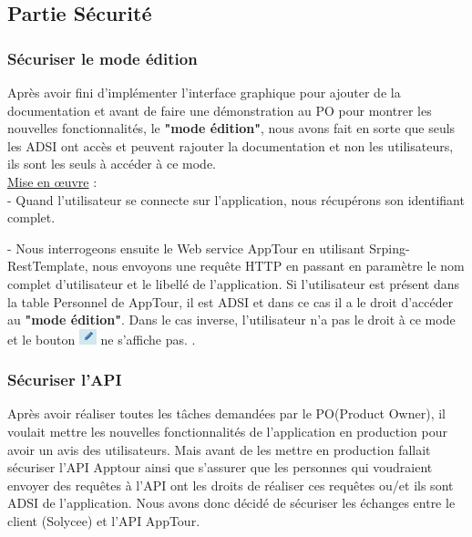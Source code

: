 \documentclass[12pt]{article}
\begin{document}
\subsection{Partie Sécurité}

\subsubsection{Sécuriser le mode édition}
	
	Après avoir fini d'implémenter l'interface graphique pour ajouter de la documentation et avant de faire une démonstration au PO pour montrer les nouvelles fonctionnalités, le \textbf{"mode édition"}, nous avons fait en sorte que seuls les ADSI ont accès et peuvent rajouter la documentation et non les utilisateurs, ils sont les seuls à accéder à ce mode.\\   
  
  
\underline{Mise en œuvre} : \\
- Quand l'utilisateur se connecte sur l'application, nous récupérons son identifiant complet.

- Nous interrogeons ensuite le Web service AppTour en utilisant  Srping-RestTemplate\footnotemark, nous envoyons une requête HTTP en passant en paramètre le nom complet d'utilisateur et le libellé de l'application. Si l'utilisateur est présent dans la table Personnel de AppTour, il est ADSI et dans ce cas il a le droit d'accéder au \textbf{"mode édition"}. Dans le cas inverse, l'utilisateur n'a pas le droit à ce mode et le bouton \includegraphics[width=5mm,scale=0.5]{diagrammes/Bouton_modeEdition.png} ne s'affiche pas.
.\\


\subsubsection{Sécuriser l'API}

Après avoir réaliser toutes les tâches demandées par le PO(Product Owner), il voulait mettre les nouvelles fonctionnalités de l'application en production pour avoir un avis des utilisateurs. Mais avant de les mettre en production fallait sécuriser l'API Apptour ainsi que s'assurer que les personnes qui voudraient envoyer des requêtes à l'API ont les droits de réaliser ces requêtes ou/et ils sont ADSI de l'application. Nous avons donc décidé de sécuriser les échanges entre le client (Solycee) et l'API AppTour. 
\end{document}
